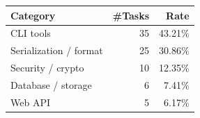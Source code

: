 \begin{tabular}{lrr}
\toprule
Category & \#Tasks & Rate \\
\midrule
CLI tools & 35 & 43.21\% \\
Serialization / format & 25 & 30.86\% \\
Security / crypto & 10 & 12.35\% \\
Database / storage & 6 & 7.41\% \\
Web API & 5 & 6.17\% \\
\bottomrule
\end{tabular}
